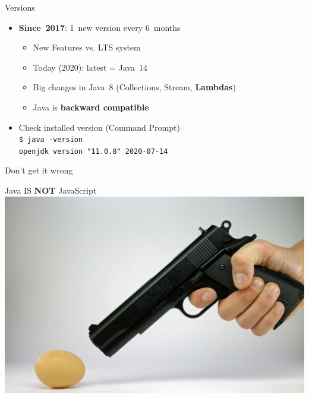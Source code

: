 \documentclass[English,c,%
hyperref={%
    pdftitle={FISA-DE2 OOP in Java},%
    pdfauthor={Muller, Gravier, Laforest, Subercaze},%
    pdfsubject={OOP in Java},%
    pdfkeywords={OOP, Java},%
    colorlinks=true,%
    urlcolor=blue,%
    linkcolor=%
    },%
xcolor={pdftex,svgnames} %
]{beamer}
\begin{document}
\begin{frame}{Versions}
%
  \begin{itemize}
    \item \textbf{Since~2017}: 1~new version every 6~months
    \begin{itemize}
      \item New Features vs. LTS system
      \item Today (2020): latest = Java~14
      \item Big changes in Java~8 (Collections, Stream, \textbf{Lambdas})
      \item Java is \textbf{backward compatible}
    \end{itemize}
    \medskip
    \item Check installed version (Command Prompt)\\
    \texttt{\$ java -version}\\
    \texttt{openjdk version "11.0.8" 2020-07-14}
  \end{itemize}

\end{frame}

\begin{frame}{Don't get it wrong}
  \begin{center}
    Java IS \textbf{NOT} JavaScript \\[1.5em]
    \includegraphics[width=.8\linewidth,height=.6\textheight]{./images01/killegg.jpg}
  \end{center}
\end{frame}
\end{document}
